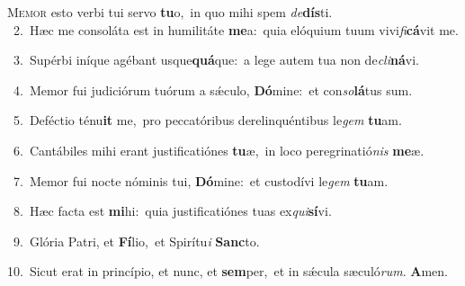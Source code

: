 \lettrine{\initial\textcolor{\initialcolor}{M}}{emor} esto verbi tui servo \textbf{tu}\-o,~\star in quo mihi spem \textit{de}\-\textbf{dís}ti.\\
{\numbfont\textcolor{\numbcolor}{~2.}}~Hæc me consoláta est in humilitáte \textbf{me}\-a:~\star quia elóquium tuum vivi\-\textit{fi}\-\textbf{cá}vit me.\par
{\numbfont\textcolor{\numbcolor}{~3.}}~Supérbi iníque agébant usque\-\textbf{quá}\-que:~\star a lege autem tua non de\-\textit{cli}\-\textbf{ná}vi.\par
{\numbfont\textcolor{\numbcolor}{~4.}}~Memor fui judiciórum tuórum a sǽculo, \textbf{Dó}\-mine:~\star et con\-\textit{so}\-\textbf{lá}tus sum.\par
{\numbfont\textcolor{\numbcolor}{~5.}}~Deféctio ténu\textbf{it} me,~\star pro peccatóribus derelinquéntibus le\textit{gem} \textbf{tu}\-am.\par
{\numbfont\textcolor{\numbcolor}{~6.}}~Cantábiles mihi erant justificatiónes \textbf{tu}\-æ,~\star in loco peregrinatió\textit{nis} \textbf{me}\-æ.\par
{\numbfont\textcolor{\numbcolor}{~7.}}~Memor fui nocte nóminis tui, \textbf{Dó}\-mine:~\star et custodívi le\textit{gem} \textbf{tu}\-am.\par
{\numbfont\textcolor{\numbcolor}{~8.}}~Hæc facta est \textbf{mi}\-hi:~\star quia justificatiónes tuas ex\-\textit{qui}\-\textbf{sí}vi.\par
{\numbfont\textcolor{\numbcolor}{~9.}}~Glória Patri, et \textbf{Fí}\-lio,~\star et Spirítu\textit{i} \textbf{Sanc}\-to.\par
{\numbfont\textcolor{\numbcolor}{10.}}~Sicut erat in princípio, et nunc, et \textbf{sem}\-per,~\star et in sǽcula sæculó\-\textit{rum}\-. \textbf{A}\-men.\par
